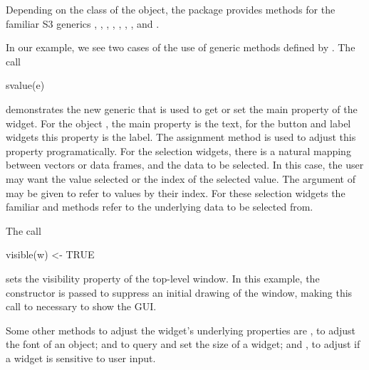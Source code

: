 Depending on the class of the object, the  package provides methods
for the familiar S3 generics \generic{[}, \generic{[$<$-},
, , , ,
,  and .


In our example, we see two cases of the use of generic methods defined by
. The call
\begin{Schunk}
\begin{Sinput}
 svalue(e)
\end{Sinput}
\end{Schunk}
%
demonstrates the new generic  that is used to get
or set the main property of the widget. For the object , the
main property is the text, for the button and label widgets this
property is the label. The  assignment method is
used to adjust this property programatically.  For the selection
widgets, there is a natural mapping between vectors or data frames,
and the data to be selected. In this case, the user may want the value
selected or the index of the selected value. The 
argument of  may be given to refer to values by their
index. For these selection widgets the familiar \meth{[} and
\meth{[\ASSIGN} methods refer to the underlying data to be selected
from.



The call
\begin{Schunk}
\begin{Sinput}
 visible(w) <- TRUE
\end{Sinput}
\end{Schunk}
%
sets the visibility property of the top-level window. In this example,
the  constructor is passed  to
suppress an initial drawing of the window, making this call to  necessary to show
the GUI.

Some other methods to adjust the widget's underlying properties are ,
to adjust the font of an object;  and  to
query and set the size of a widget; and , to adjust
if a widget is sensitive to user input. 


